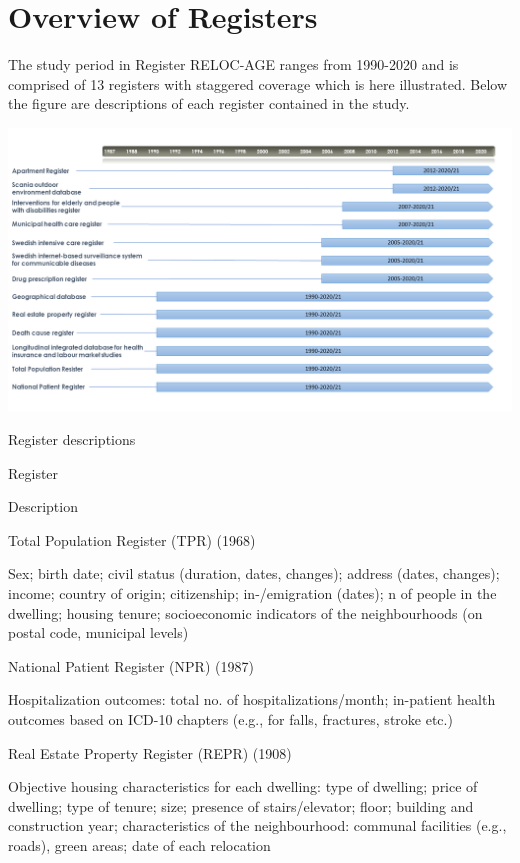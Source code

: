 \documentclass[
]{book}
\begin{document}
\hypertarget{overview-of-registers}{%
\chapter{Overview of Registers}\label{overview-of-registers}}

The study period in Register RELOC-AGE ranges from 1990-2020 and is comprised of 13 registers with staggered coverage which is here illustrated. Below the figure are descriptions of each register contained in the study.

\includegraphics[width=1\linewidth]{output/figures/registers_timeline}

\label{tab:unnamed-chunk-3}Register descriptions

Register

Description

Total Population Register (TPR) (1968)

Sex; birth date; civil status (duration, dates, changes); address (dates, changes); income; country of origin; citizenship; in-/emigration (dates); n of people in the dwelling; housing tenure; socioeconomic indicators of the neighbourhoods (on postal code, municipal levels)

National Patient Register (NPR) (1987)

Hospitalization outcomes: total no. of hospitalizations/month; in-patient health outcomes based on ICD-10 chapters (e.g., for falls, fractures, stroke etc.)

Real Estate Property Register (REPR) (1908)

Objective housing characteristics for each dwelling: type of dwelling; price of dwelling; type of tenure; size; presence of stairs/elevator; floor; building and construction year; characteristics of the neighbourhood: communal facilities (e.g., roads), green areas; date of each relocation
\end{document}
